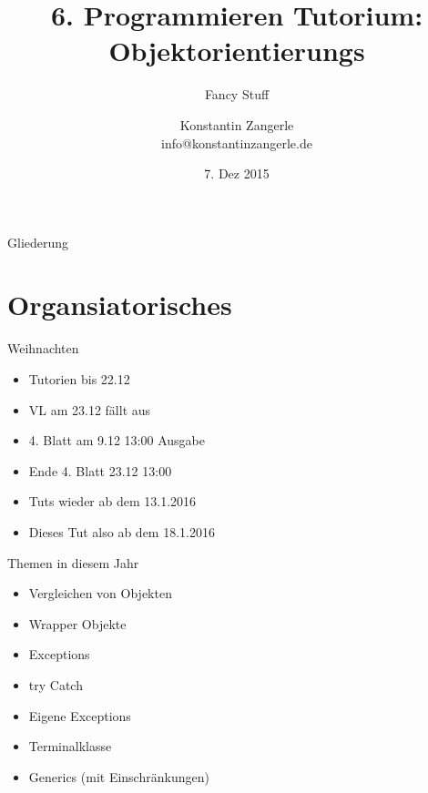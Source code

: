 \documentclass[18pt]{beamer}
\title[Programmieren Tutorium]{6. Programmieren Tutorium:\texorpdfstring{\\}{} Objektorientierungs}
\subtitle{Fancy Stuff}
\author{Konstantin Zangerle \texorpdfstring{\\}{} info@konstantinzangerle.de}
\date{7. Dez 2015}
\begin{document}

\begin{frame}
\titlepage
\end{frame}

\begin{frame}{Gliederung}
\tableofcontents
\end{frame}

\section{Organsiatorisches}

\begin{frame}{Weihnachten}
 \begin{itemize}
  \item Tutorien bis 22.12
  \item VL am 23.12 fällt aus
  \item 4. Blatt am 9.12 13:00 Ausgabe
  \item Ende 4. Blatt 23.12 13:00
  \item Tuts wieder ab dem 13.1.2016
  \item Dieses Tut also ab dem 18.1.2016
 \end{itemize}

\end{frame}

\begin{frame}{Themen in diesem Jahr}
\begin{itemize}
 \item Vergleichen von Objekten
 \item Wrapper Objekte
 \item Exceptions
 \item try Catch
 \item Eigene Exceptions
 \item Terminalklasse
 \item Generics (mit Einschränkungen)
\end{itemize}

 
\end{frame}
\end{document}
